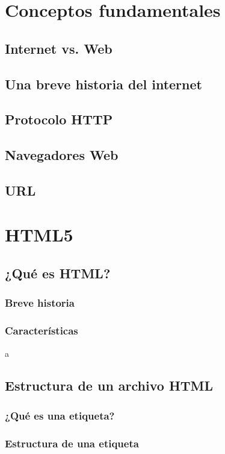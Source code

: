 \documentclass[12pt]{report}
\begin{document}
	\section{Conceptos fundamentales}
		\subsection{Internet vs. Web}
			
		\subsection{Una breve historia del internet}
			
		\subsection{Protocolo HTTP}
			
		\subsection{Navegadores Web}
			
		\subsection{URL}
			
	\section{HTML5}
		\subsection{¿Qué es HTML?}
			\subsubsection{Breve historia}
			\subsubsection{Características}
				a
		\subsection{Estructura de un archivo HTML}
			\subsubsection{¿Qué es una etiqueta?}
			\subsubsection{Estructura de una etiqueta}
\end{document}

